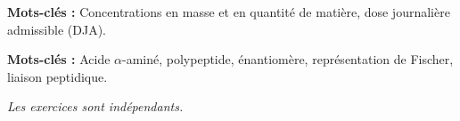 \newpage
\vAligne{-70pt}

\begin{boite}
  \centering

  \begin{multicols}{2}
    \begin{boite}
      \begin{center}
      \end{center}
      \vspace*{-12pt}  
      \textbf{Mots-clés :} Concentrations en masse et en quantité de matière, dose journalière admissible (DJA).
    \end{boite}
    \begin{boite}
      \begin{center}
      \end{center}
      \vspace*{-12pt}  
      \textbf{Mots-clés :} Acide $\alpha$-aminé, polypeptide, énantiomère, représentation de Fischer, liaison peptidique.
    \end{boite}
  \end{multicols}
\end{boite}


\begin{center} 
  \textit{Les exercices sont indépendants.}
\end{center}

\vspace*{20pt}


\vspace*{24pt}



